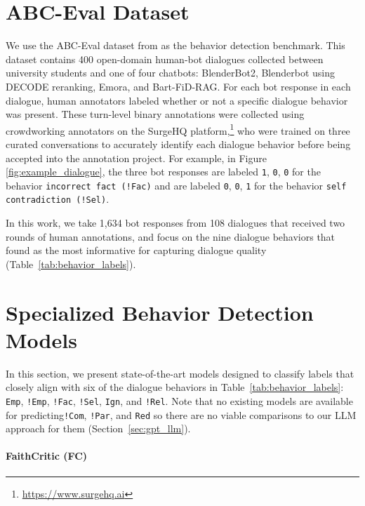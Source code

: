 \section{ABC-Eval Dataset}
\label{sec:dataset} 

We use the ABC-Eval dataset from \citet{finch:23} as the behavior detection benchmark. This dataset contains 400 open-domain human-bot dialogues collected between university students and one of four chatbots: BlenderBot2, Blenderbot using DECODE reranking, Emora, and Bart-FiD-RAG. For each bot response in each dialogue, human annotators labeled whether or not a specific dialogue behavior was present. These turn-level binary annotations were collected using crowdworking annotators on the SurgeHQ platform,\footnote{\url{https://www.surgehq.ai}} who were trained on three curated conversations to accurately identify each dialogue behavior before being accepted into the annotation project. For example, in Figure \ref{fig:example_dialogue}, the three bot responses are labeled \texttt{1}, \texttt{0}, \texttt{0} for the behavior \texttt{incorrect fact (!Fac)} and are labeled \texttt{0}, \texttt{0}, \texttt{1} for the behavior  \texttt{self contradiction (!Sel)}.

In this work, we take 1,634 bot responses from 108 dialogues that received two rounds of human annotations, and focus on the nine dialogue behaviors that \citet{finch:23} found as the most informative for capturing dialogue quality (Table~\ref{tab:behavior_labels}).

\section{Specialized Behavior Detection Models}
\label{sec:models}

In this section, we present state-of-the-art models designed to classify labels that closely align with six of the dialogue behaviors in Table~\ref{tab:behavior_labels}: \texttt{Emp}, \texttt{!Emp}, \texttt{!Fac}, \texttt{!Sel}, \texttt{Ign}, and \texttt{!Rel}.
Note that no existing models are available for predicting\linebreak \texttt{!Com}, \texttt{!Par}, and \texttt{Red} so there are no viable comparisons to our LLM approach for them (Section~\ref{sec:gpt_llm}).

\paragraph{FaithCritic (FC)} 

